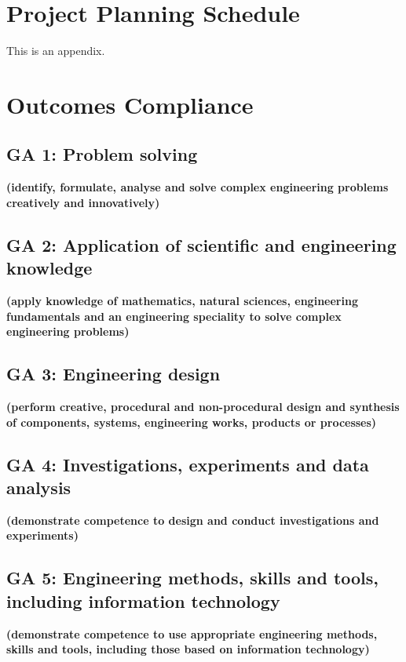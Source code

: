 \chapter{Project Planning Schedule}
\makeatletter{}\makeatother
\label{appen:appa}



This is an appendix.

\chapter{Outcomes Compliance}
\makeatletter{}\makeatother
\label{appen:appb}

\section{GA 1: Problem solving}
\textbf{(identify, formulate, analyse and solve complex engineering problems creatively and innovatively) }

\section{GA 2: Application of scientific and engineering knowledge}
\textbf{(apply knowledge of mathematics, natural sciences, engineering fundamentals and an engineering speciality to solve complex engineering problems) }

\section{GA 3: Engineering design}
\textbf{(perform creative, procedural and non-procedural design and synthesis of components, systems, engineering works, products or processes) }


\section{GA 4: Investigations, experiments and data analysis}
\textbf{(demonstrate competence to design and conduct investigations and experiments)  }


\section{GA 5: Engineering methods, skills and tools, including information technology}
\textbf{(demonstrate competence to use appropriate engineering methods, skills and tools, including those based on information technology) }


